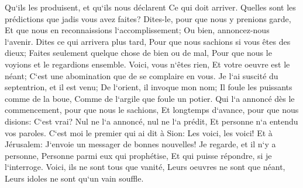 \verse Qu`ils les produisent, et qu`ils nous déclarent Ce qui doit arriver. Quelles sont les prédictions que jadis vous avez faites? Dites-le, pour que nous y prenions garde, Et que nous en reconnaissions l`accomplissement; Ou bien, annoncez-nous l`avenir. 
\verse Dites ce qui arrivera plus tard, Pour que nous sachions si vous êtes des dieux; Faites seulement quelque chose de bien ou de mal, Pour que nous le voyions et le regardions ensemble. 
\verse Voici, vous n`êtes rien, Et votre oeuvre est le néant; C`est une abomination que de se complaire en vous. 
\verse Je l`ai suscité du septentrion, et il est venu; De l`orient, il invoque mon nom; Il foule les puissants comme de la boue, Comme de l`argile que foule un potier. 
\verse Qui l`a annoncé dès le commencement, pour que nous le sachions, Et longtemps d`avance, pour que nous disions: C`est vrai? Nul ne l`a annoncé, nul ne l`a prédit, Et personne n`a entendu vos paroles. 
\verse C`est moi le premier qui ai dit à Sion: Les voici, les voici! Et à Jérusalem: J`envoie un messager de bonnes nouvelles! 
\verse Je regarde, et il n`y a personne, Personne parmi eux qui prophétise, Et qui puisse répondre, si je l`interroge. 
\verse Voici, ils ne sont tous que vanité, Leurs oeuvres ne sont que néant, Leurs idoles ne sont qu`un vain souffle. 

\chapter{}

